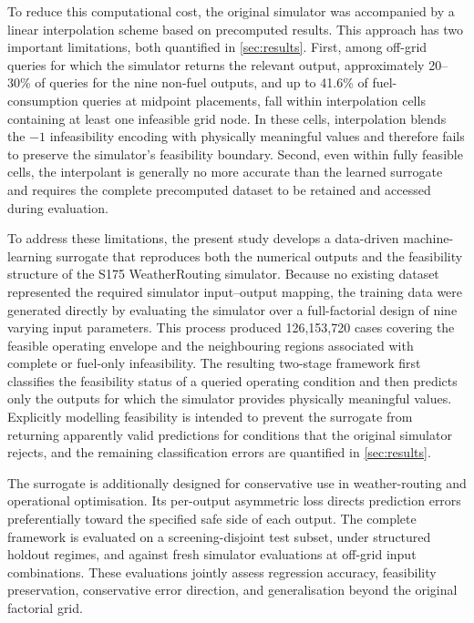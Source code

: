 \documentclass[final,5p,times,twocolumn,numbers]{elsarticle}
\begin{document}
To reduce this computational cost, the original simulator was accompanied by a linear interpolation scheme based on precomputed results. This approach has two important limitations, both quantified in \autoref{sec:results}. First, among off-grid queries for which the simulator returns the relevant output, approximately 20--30\% of queries for the nine non-fuel outputs, and up to 41.6\% of fuel-consumption queries at midpoint placements, fall within interpolation cells containing at least one infeasible grid node. In these cells, interpolation blends the $-1$ infeasibility encoding with physically meaningful values and therefore fails to preserve the simulator's feasibility boundary. Second, even within fully feasible cells, the interpolant is generally no more accurate than the learned surrogate and requires the complete precomputed dataset to be retained and accessed during evaluation.

To address these limitations, the present study develops a data-driven machine-learning surrogate that reproduces both the numerical outputs and the feasibility structure of the S175 WeatherRouting simulator. Because no existing dataset represented the required simulator input--output mapping, the training data were generated directly by evaluating the simulator over a full-factorial design of nine varying input parameters. This process produced 126{,}153{,}720 cases covering the feasible operating envelope and the neighbouring regions associated with complete or fuel-only infeasibility. The resulting two-stage framework first classifies the feasibility status of a queried operating condition and then predicts only the outputs for which the simulator provides physically meaningful values. Explicitly modelling feasibility is intended to prevent the surrogate from returning apparently valid predictions for conditions that the original simulator rejects, and the remaining classification errors are quantified in \autoref{sec:results}.

The surrogate is additionally designed for conservative use in weather-routing and operational optimisation. Its per-output asymmetric loss directs prediction errors preferentially toward the specified safe side of each output. The complete framework is evaluated on a screening-disjoint test subset, under structured holdout regimes, and against fresh simulator evaluations at off-grid input combinations. These evaluations jointly assess regression accuracy, feasibility preservation, conservative error direction, and generalisation beyond the original factorial grid.
\end{document}
